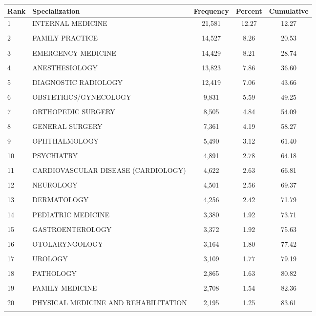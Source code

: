 \begin{tabular}{l l c c c}
\toprule
Rank & Specialization & Frequency & Percent & Cumulative \\ \midrule
1 & INTERNAL MEDICINE & 21,581 & 12.27 & 12.27 \\\\
2 & FAMILY PRACTICE & 14,527 & 8.26 & 20.53 \\\\
3 & EMERGENCY MEDICINE & 14,429 & 8.21 & 28.74 \\\\
4 & ANESTHESIOLOGY & 13,823 & 7.86 & 36.60 \\\\
5 & DIAGNOSTIC RADIOLOGY & 12,419 & 7.06 & 43.66 \\\\
6 & OBSTETRICS/GYNECOLOGY & 9,831 & 5.59 & 49.25 \\\\
7 & ORTHOPEDIC SURGERY & 8,505 & 4.84 & 54.09 \\\\
8 & GENERAL SURGERY & 7,361 & 4.19 & 58.27 \\\\
9 & OPHTHALMOLOGY & 5,490 & 3.12 & 61.40 \\\\
10 & PSYCHIATRY & 4,891 & 2.78 & 64.18 \\\\
11 & CARDIOVASCULAR DISEASE (CARDIOLOGY) & 4,622 & 2.63 & 66.81 \\\\
12 & NEUROLOGY & 4,501 & 2.56 & 69.37 \\\\
13 & DERMATOLOGY & 4,256 & 2.42 & 71.79 \\\\
14 & PEDIATRIC MEDICINE & 3,380 & 1.92 & 73.71 \\\\
15 & GASTROENTEROLOGY & 3,372 & 1.92 & 75.63 \\\\
16 & OTOLARYNGOLOGY & 3,164 & 1.80 & 77.42 \\\\
17 & UROLOGY & 3,109 & 1.77 & 79.19 \\\\
18 & PATHOLOGY & 2,865 & 1.63 & 80.82 \\\\
19 & FAMILY MEDICINE & 2,708 & 1.54 & 82.36 \\\\
20 & PHYSICAL MEDICINE AND REHABILITATION & 2,195 & 1.25 & 83.61 \\\\
\bottomrule
\end{tabular}
